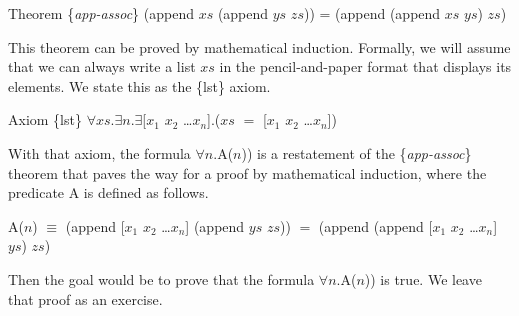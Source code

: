 \begin{samepage}
\label{app-assoc}
\begin{center}
Theorem \{\emph{app-assoc}\} (append $xs$ (append $ys$ $zs$)) = (append (append $xs$ $ys$) $zs$)
\end{center}
\end{samepage}

This theorem can be proved by mathematical induction.
Formally, we will assume that
we can always write a list $xs$ in the pencil-and-paper format that
displays its elements. We state this as the \{lst\} axiom.

\begin{center}
Axiom \{lst\} $\forall xs.\exists n.\exists$[$x_1$ $x_2$ \dots $x_n$].($xs$ $=$ [$x_1$ $x_2$ \dots $x_n$])
\end{center}

With that axiom, the formula $\forall$$n$.A($n$))
is a restatement of the \{\emph{app-assoc}\} theorem that paves the way for a proof
by mathematical induction, where the predicate A is defined as follows.

\begin{samepage}
\begin{center}
A($n$) $\equiv$ (append [$x_1$ $x_2$ \dots $x_n$] (append $ys$ $zs$)) $=$ (append (append [$x_1$ $x_2$ \dots $x_n$] $ys$) $zs$)
\end{center}
\end{samepage}

Then the goal would be to prove that the formula $\forall$$n$.A($n$)) is true.
We leave that proof as an exercise.

